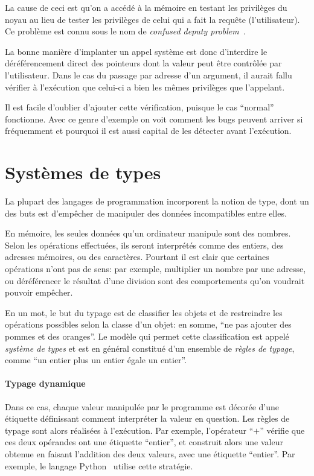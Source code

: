 La cause de ceci est qu'on a accédé à la mémoire en testant les privilèges du
noyau au lieu de tester les privilèges de celui qui a fait la requête
(l'utilisateur). Ce problème est connu sous le nom de \emph{confused deputy
problem}~\cite{hardy88confused}.

La bonne manière d'implanter un appel système est donc d'interdire le
déréférencement direct des pointeurs dont la valeur peut être contrôlée par
l'utilisateur. Dans le cas du passage par adresse d'un argument, il aurait fallu
vérifier à l'exécution que celui-ci a bien les mêmes privilèges que l'appelant.


Il est facile d'oublier d'ajouter cette vérification, puisque le cas ``normal''
fonctionne. Avec ce genre d'exemple on voit comment les bugs peuvent arriver si
fréquemment et pourquoi il est aussi capital de les détecter avant l'exécution.

\section{Systèmes de types}
\label{sec:types-intro}

La plupart des langages de programmation incorporent la notion de type, dont un
des buts est d'empêcher de manipuler des données incompatibles entre elles.

En mémoire, les seules données qu'un ordinateur manipule sont des nombres. Selon
les opérations effectuées, ils seront interprétés comme des entiers, des
adresses mémoires, ou des caractères. Pourtant il est clair que certaines
opérations n'ont pas de sens: par exemple, multiplier un nombre par une adresse,
ou déréférencer le résultat d'une division sont des comportements qu'on voudrait
pouvoir empêcher.

En un mot, le but du typage est de classifier les objets et de restreindre les
opérations possibles selon la classe d'un objet: en somme, ``ne pas ajouter des
pommes et des oranges''. Le modèle qui permet cette classification est appelé
\emph{système de types} et est en général constitué d'un ensemble de
\emph{règles de typage}, comme ``un entier plus un entier égale un entier''.

\paragraph{Typage dynamique}

Dans ce cas, chaque valeur manipulée par le programme est décorée d'une
étiquette définissant comment interpréter la valeur en question. Les règles de
typage sont alors réalisées à l'exécution. Par exemple, l'opérateur ``$+$''
vérifie que ces deux opérandes ont une étiquette ``entier'', et construit alors
une valeur obtenue en faisant l'addition des deux valeurs, avec une étiquette
``entier''. Par exemple, le langage Python~ utilise cette
stratégie.

